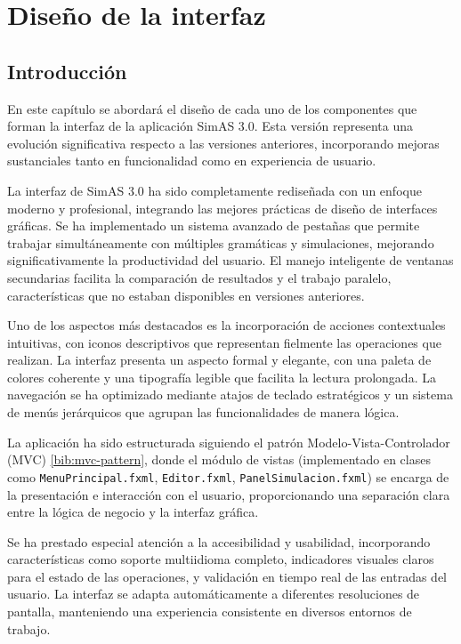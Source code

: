 \chapter{Diseño de la interfaz} \label{cap:diseño_interfaz}

 \section{Introducción}

En este capítulo se abordará el diseño de cada uno de los componentes que forman la interfaz de la aplicación SimAS 3.0. Esta versión representa una evolución significativa respecto a las versiones anteriores, incorporando mejoras sustanciales tanto en funcionalidad como en experiencia de usuario.

La interfaz de SimAS 3.0 ha sido completamente rediseñada con un enfoque moderno y profesional, integrando las mejores prácticas de diseño de interfaces gráficas. Se ha implementado un sistema avanzado de pestañas que permite trabajar simultáneamente con múltiples gramáticas y simulaciones, mejorando significativamente la productividad del usuario. El manejo inteligente de ventanas secundarias facilita la comparación de resultados y el trabajo paralelo, características que no estaban disponibles en versiones anteriores.

Uno de los aspectos más destacados es la incorporación de acciones contextuales intuitivas, con iconos descriptivos que representan fielmente las operaciones que realizan. La interfaz presenta un aspecto formal y elegante, con una paleta de colores coherente y una tipografía legible que facilita la lectura prolongada. La navegación se ha optimizado mediante atajos de teclado estratégicos y un sistema de menús jerárquicos que agrupan las funcionalidades de manera lógica.

La aplicación ha sido estructurada siguiendo el patrón Modelo-Vista-Controlador (MVC) \ref{bib:mvc-pattern}, donde el módulo de vistas (implementado en clases como \texttt{MenuPrincipal.fxml}, \texttt{Editor.fxml}, \texttt{PanelSimulacion.fxml}) se encarga de la presentación e interacción con el usuario, proporcionando una separación clara entre la lógica de negocio y la interfaz gráfica.

Se ha prestado especial atención a la accesibilidad y usabilidad, incorporando características como soporte multiidioma completo, indicadores visuales claros para el estado de las operaciones, y validación en tiempo real de las entradas del usuario. La interfaz se adapta automáticamente a diferentes resoluciones de pantalla, manteniendo una experiencia consistente en diversos entornos de trabajo.

